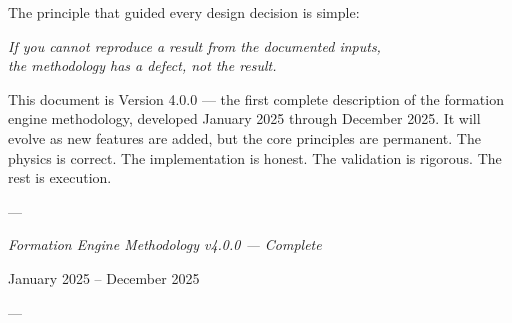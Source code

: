 \documentclass[11pt]{article}
\begin{document}
The principle that guided every design decision is simple:

\begin{center}
\textit{If you cannot reproduce a result from the documented inputs,} \\
\textit{the methodology has a defect, not the result.}
\end{center}

This document is Version 4.0.0 --- the first complete description of the formation engine methodology, developed January 2025 through December 2025. It will evolve as new features are added, but the core principles are permanent. The physics is correct. The implementation is honest. The validation is rigorous. The rest is execution.

\vspace{1cm}

\begin{center}
---

\textit{Formation Engine Methodology v4.0.0 --- Complete}

January 2025 -- December 2025

---
\end{center}
\end{document}
